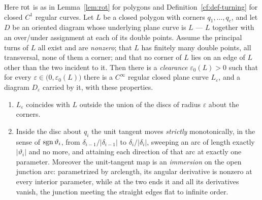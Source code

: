 \begin{lemma}[rounding]\label{cf:lem-rounding}
Here $\operatorname{rot}$ is as in Lemma~\ref{lem:rot} for polygons and
Definition~\ref{cf:def-turning} for closed $C^1$ regular curves.
Let $L$ be a closed polygon with corners $q_1,\dots,q_c$, and let $D$ be an
oriented diagram whose underlying plane curve is $L$ --- $L$ together with an
over/under assignment at each of its double points. Assume the principal turns
of $L$ all exist and are \emph{nonzero}; that $L$ has finitely many double
points, all transversal, none of them a corner; and that no corner of $L$ lies
on an edge of $L$ other than the two incident to it. Then there is a \emph{clearance} $\varepsilon_0(L)>0$ such that for every
$\varepsilon\in\bigl(0,\varepsilon_0(L)\bigr)$ there is a $C^\infty$ regular
closed plane curve $L_\varepsilon$, and a diagram $D_\varepsilon$ carried by it, with
these properties.
\begin{enumerate}
\item[(a)] $L_\varepsilon$ coincides with $L$ outside the union of the discs of
radius $\varepsilon$ about the corners.
\item[(b)] Inside the disc about $q_i$ the unit tangent moves \emph{strictly}
monotonically, in the sense of $\operatorname{sgn}\vartheta_i$, from $\delta_{i-1}/|\delta_{i-1}|$
to $\delta_i/|\delta_i|$, sweeping an arc of length exactly $|\vartheta_i|$ and no
more, and attaining each direction of that arc at exactly one parameter.
Moreover the unit-tangent map is an \emph{immersion} on the open junction arc:
parametrized by arclength, its angular derivative is nonzero at every interior
parameter, while at the two ends it and all its derivatives vanish, the
junction meeting the straight edges flat to infinite order.


\end{enumerate}
\end{lemma}
